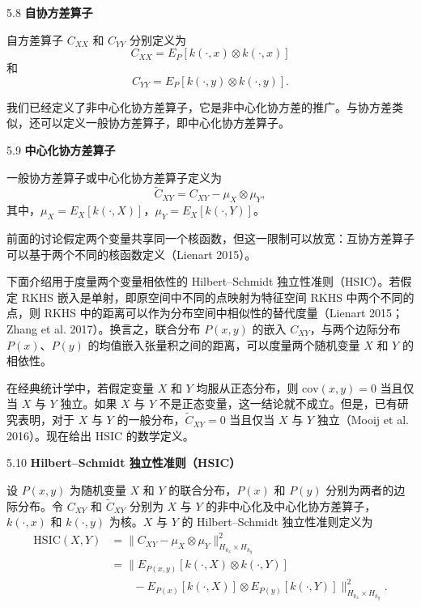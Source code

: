 \begin{bookdefinition}{5.8}
\textbf{自协方差算子}

自方差算子 $C_{XX}$ 和 $C_{YY}$ 分别定义为
\begin{equation}
C_{XX}=E_P[k(\cdot,x)\otimes k(\cdot,x)]
\tag{5.43}
\end{equation}
和
\begin{equation}
C_{YY}=E_P[k(\cdot,y)\otimes k(\cdot,y)].
\tag{5.44}
\end{equation}
\end{bookdefinition}

我们已经定义了非中心化协方差算子，它是非中心化协方差的推广。与协方差类似，还可以定义一般协方差算子，即中心化协方差算子。

\begin{bookdefinition}{5.9}
\textbf{中心化协方差算子}

一般协方差算子或中心化协方差算子定义为
\begin{equation}
\widetilde C_{XY}=C_{XY}-\mu_X\otimes\mu_Y,
\tag{5.45}
\end{equation}
其中，$\mu_X=E_X[k(\cdot,X)]$，$\mu_Y=E_X[k(\cdot,Y)]$。
\end{bookdefinition}

前面的讨论假定两个变量共享同一个核函数，但这一限制可以放宽：互协方差算子可以基于两个不同的核函数定义（Lienart 2015）。

下面介绍用于度量两个变量相依性的 Hilbert–Schmidt 独立性准则（HSIC）。若假定 RKHS 嵌入是单射，即原空间中不同的点映射为特征空间 RKHS 中两个不同的点，则 RKHS 中的距离可以作为分布空间中相似性的替代度量（Lienart 2015；Zhang et al. 2017）。换言之，联合分布 $P(x,y)$ 的嵌入 $C_{XY}$，与两个边际分布 $P(x)$、$P(y)$ 的均值嵌入张量积之间的距离，可以度量两个随机变量 $X$ 和 $Y$ 的相依性。

在经典统计学中，若假定变量 $X$ 和 $Y$ 均服从正态分布，则 $\mathrm{cov}(x,y)=0$ 当且仅当 $X$ 与 $Y$ 独立。如果 $X$ 与 $Y$ 不是正态变量，这一结论就不成立。但是，已有研究表明，对于 $X$ 与 $Y$ 的一般分布，$\widetilde C_{XY}=0$ 当且仅当 $X$ 与 $Y$ 独立（Mooij et al. 2016）。现在给出 HSIC 的数学定义。

\begin{bookdefinition}{5.10}
\textbf{Hilbert–Schmidt 独立性准则（HSIC）}

设 $P(x,y)$ 为随机变量 $X$ 和 $Y$ 的联合分布，$P(x)$ 和 $P(y)$ 分别为两者的边际分布。令 $C_{XY}$ 和 $\widetilde C_{XY}$ 分别为 $X$ 与 $Y$ 的非中心化及中心化协方差算子，$k(\cdot,x)$ 和 $k(\cdot,y)$ 为核。$X$ 与 $Y$ 的 Hilbert–Schmidt 独立性准则定义为
\begin{equation}
\begin{aligned}
\mathrm{HSIC}(X,Y)
&=\lVert C_{XY}-\mu_X\otimes\mu_Y\rVert_{H_{k_x}\times H_{k_y}}^2\\
&=\bigl\lVert E_{P(x,y)}[k(\cdot,X)\otimes k(\cdot,Y)]\\
&\qquad-E_{P(x)}[k(\cdot,X)]\otimes E_{P(y)}[k(\cdot,Y)]\bigr\rVert_{H_{k_x}\times H_{k_y}}^2.
\end{aligned}
\tag{5.46}
\end{equation}
\end{bookdefinition}

